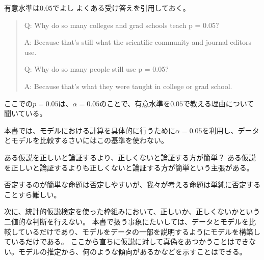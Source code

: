 \begin{SMbox}{有意水準は$0.05$でよし}
    よくある受け答えを引用しておく\cite{greenland2016statistical}。
    \begin{quote}
        Q: Why do so many colleges and grad schools teach p = 0.05?

        A: Because that's still what the scientific community and journal editors use.

        Q: Why do so many people still use p = 0.05?

        A: Because that's what they were taught in college or grad school.
    \end{quote}
 ここでの$p=0.05$は、$\alpha=0.05$のことで、有意水準を$0.05$で教える理由について聞いている。

本書では、モデルにおける計算を具体的に行うために$\alpha=0.05$を利用し、データとモデルを比較するさいにはこの基準を使わない。
\end{SMbox}

\begin{SMbox}{ある仮説を正しいと論証するより、正しくないと論証する方が簡単？}
 ある仮説を正しいと論証するよりも正しくないと論証する方が簡単という主張がある。
 
 否定するのが簡単な命題は否定しやすいが、我々が考える命題は単純に否定することすら難しい。

 次に、統計的仮説検定を使った枠組みにおいて、正しいか、正しくないかという二値的な判断を行えない。
 本書で扱う事象にたいしては、データとモデルを比較しているだけであり、モデルをデータの一部を説明するようにモデルを構築しているだけである。
 ここから直ちに仮説に対して真偽をあつかうことはできない。モデルの推定から、何のような傾向があるかなどを示すことはできる。
\end{SMbox}

